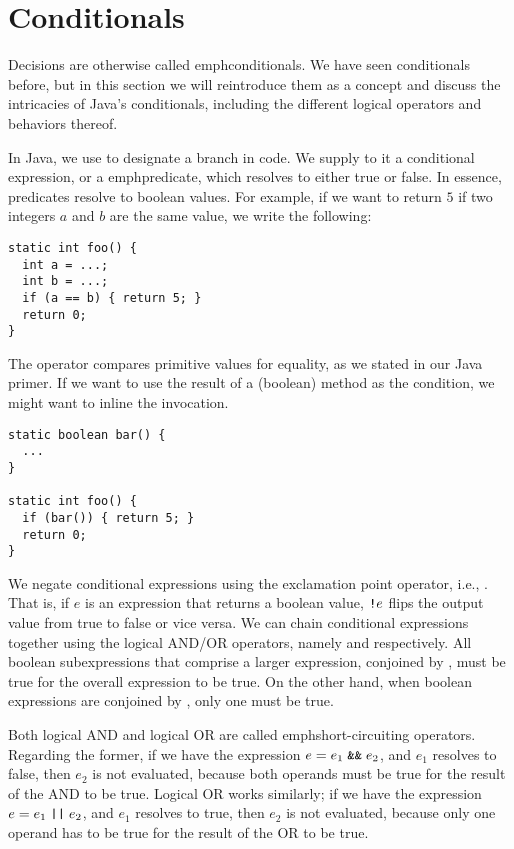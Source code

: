 \section{Conditionals}

Decisions are otherwise called emph{conditionals}. We have seen conditionals before, but in this section we will reintroduce them as a concept and discuss the intricacies of Java's conditionals, including the different logical operators and behaviors thereof.

In Java, we use  to designate a branch in code. We supply to it a conditional expression, or a emph{predicate}, which resolves to either true or false. In essence, predicates resolve to boolean values. For example, if we want to return $5$ if two integers $a$ and $b$ are the same value, we write the following:
\begin{cl}[]{}
\begin{lstlisting}[language=MyJava]
static int foo() {
  int a = ...;
  int b = ...;
  if (a == b) { return 5; }
  return 0;
}
\end{lstlisting}
\end{cl}
The \ttt{==} operator compares primitive values for equality, as we stated in our Java primer. If we want to use the result of a (boolean) method as the condition, we might want to inline the invocation. 
\begin{cl}[]{}
\begin{lstlisting}[language=MyJava]
static boolean bar() {
  ...
}

static int foo() {
  if (bar()) { return 5; }
  return 0;
}
\end{lstlisting}
\end{cl}
We negate conditional expressions using the exclamation point operator, i.e., \ttt{!}. That is, if $e$ is an expression that returns a boolean value, $\texttt{!} e$ flips the output value from true to false or vice versa. We can chain conditional expressions together using the logical AND/OR operators, namely \ttt{\&\&} and \ttt{||} respectively. All boolean subexpressions that comprise a larger expression, conjoined by \ttt{\&\&}, must be true for the overall expression to be true. On the other hand, when boolean expressions are conjoined by \ttt{||}, only one must be true. 

Both logical AND and logical OR are called emph{short-circuiting operators}. Regarding the former, if we have the expression $e = e_1 \;\texttt{\&\&}\;e_2$, and $e_1$ resolves to false, then $e_2$ is not evaluated, because both operands must be true for the result of the AND to be true. Logical OR works similarly; if we have the expression $e = e_1\;\texttt{||}\;e_2$, and $e_1$ resolves to true, then $e_2$ is not evaluated, because only one operand has to be true for the result of the OR to be true.

